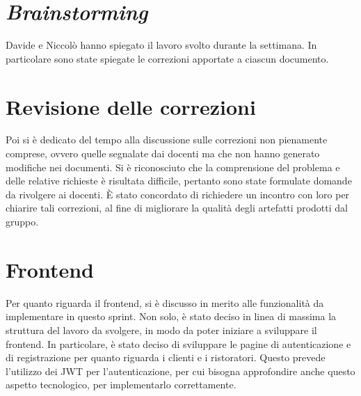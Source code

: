 \section{\textit{Brainstorming}}

Davide e Niccolò hanno spiegato il lavoro svolto durante la settimana. In
particolare sono state spiegate le correzioni apportate a ciascun documento.

\section{Revisione delle correzioni}

Poi si è dedicato del tempo alla discussione sulle correzioni non
pienamente comprese, ovvero quelle segnalate dai docenti ma che non hanno
generato modifiche nei documenti. Si è riconosciuto che la comprensione del
problema e delle relative richieste è risultata difficile, pertanto sono state
formulate domande da rivolgere ai docenti. È stato concordato di richiedere un
incontro con loro per chiarire tali correzioni, al fine di migliorare la qualità
degli artefatti prodotti dal gruppo.

\section{Frontend}

Per quanto riguarda il frontend, si è discusso in merito alle funzionalità da
implementare in questo sprint. Non solo, è stato deciso in linea di massima la
struttura del lavoro da svolgere, in modo da poter iniziare a sviluppare il
frontend. In particolare, è stato deciso di sviluppare le pagine di
autenticazione e di registrazione per quanto riguarda i clienti e i ristoratori.
Questo prevede l'utilizzo dei JWT per l'autenticazione, per cui bisogna
approfondire anche questo aspetto tecnologico, per implementarlo correttamente.
